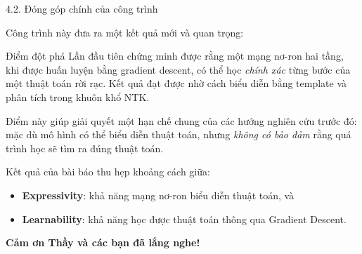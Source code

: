 \documentclass[10pt, aspectratio=169]{beamer}
\begin{document}
\begin{frame}{4.2. Đóng góp chính của công trình}

Công trình này đưa ra một kết quả mới và quan trọng:

\vspace{0.2cm}

\begin{block}{Điểm đột phá}
Lần đầu tiên chứng minh được rằng một mạng nơ-ron hai tầng,
khi được huấn luyện bằng gradient descent,
có thể học \emph{chính xác} từng bước của một thuật toán rời rạc.
Kết quả đạt được nhờ cách biểu diễn bằng template và phân tích trong khuôn khổ NTK.
\end{block}

\vspace{0.2cm}

Điểm này giúp giải quyết một hạn chế chung của các hướng nghiên cứu trước đó:
mặc dù mô hình có thể biểu diễn thuật toán,  
nhưng \emph{không có bảo đảm} rằng quá trình học sẽ tìm ra đúng thuật toán.

\vspace{0.3cm}

Kết quả của bài báo thu hẹp khoảng cách giữa:
\begin{itemize}
    \item \textbf{Expressivity}: khả năng mạng nơ-ron biểu diễn thuật toán, và
    \item \textbf{Learnability}: khả năng học được thuật toán thông qua Gradient Descent.
\end{itemize}

\end{frame}

\begin{frame}
    \centering
    \Huge \textbf{Cảm ơn Thầy và các bạn đã lắng nghe!}
\end{frame}
\end{document}
